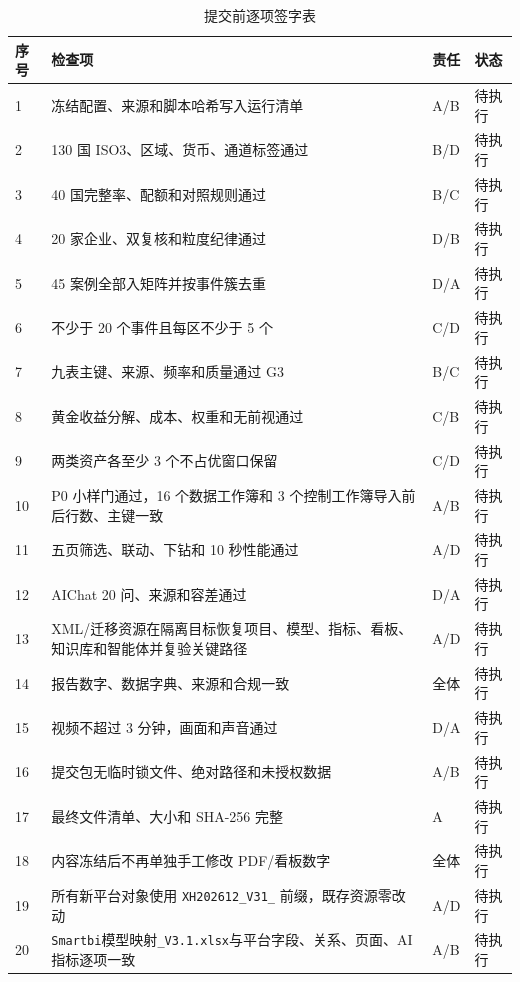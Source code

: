 \documentclass[UTF8,fontset=windows,12pt,openany]{ctexbook}
\newcommand{\Field}[1]{{\small\nolinkurl{#1}}}
\newcommand{\File}[1]{{\small\nolinkurl{#1}}}
\begin{document}
\begin{longtable}{p{1.4cm}p{9.1cm}p{1.8cm}p{1.8cm}}
\caption{提交前逐项签字表}\label{tab:final-signoff}\\
\toprule
\textbf{序号} & \textbf{检查项} & \textbf{责任} & \textbf{状态}\\
\midrule
1 & 冻结配置、来源和脚本哈希写入运行清单 & A/B & 待执行\\
2 & 130 国 ISO3、区域、货币、通道标签通过 & B/D & 待执行\\
3 & 40 国完整率、配额和对照规则通过 & B/C & 待执行\\
4 & 20 家企业、双复核和粒度纪律通过 & D/B & 待执行\\
5 & 45 案例全部入矩阵并按事件簇去重 & D/A & 待执行\\
6 & 不少于 20 个事件且每区不少于 5 个 & C/D & 待执行\\
7 & 九表主键、来源、频率和质量通过 G3 & B/C & 待执行\\
8 & 黄金收益分解、成本、权重和无前视通过 & C/B & 待执行\\
9 & 两类资产各至少 3 个不占优窗口保留 & C/D & 待执行\\
10 & P0 小样门通过，16 个数据工作簿和 3 个控制工作簿导入前后行数、主键一致 & A/B & 待执行\\
11 & 五页筛选、联动、下钻和 10 秒性能通过 & A/D & 待执行\\
12 & AIChat 20 问、来源和容差通过 & D/A & 待执行\\
13 & XML/迁移资源在隔离目标恢复项目、模型、指标、看板、知识库和智能体并复验关键路径 & A/D & 待执行\\
14 & 报告数字、数据字典、来源和合规一致 & 全体 & 待执行\\
15 & 视频不超过 3 分钟，画面和声音通过 & D/A & 待执行\\
16 & 提交包无临时锁文件、绝对路径和未授权数据 & A/B & 待执行\\
17 & 最终文件清单、大小和 SHA-256 完整 & A & 待执行\\
18 & 内容冻结后不再单独手工修改 PDF/看板数字 & 全体 & 待执行\\
19 & 所有新平台对象使用 \Field{XH202612_V31_} 前缀，既存资源零改动 & A/D & 待执行\\
20 & \File{Smartbi}\textsf{模型映射}\File{_V3.1.xlsx}与平台字段、关系、页面、AI 指标逐项一致 & A/B & 待执行\\
\bottomrule
\end{longtable}

\backmatter
\end{document}
